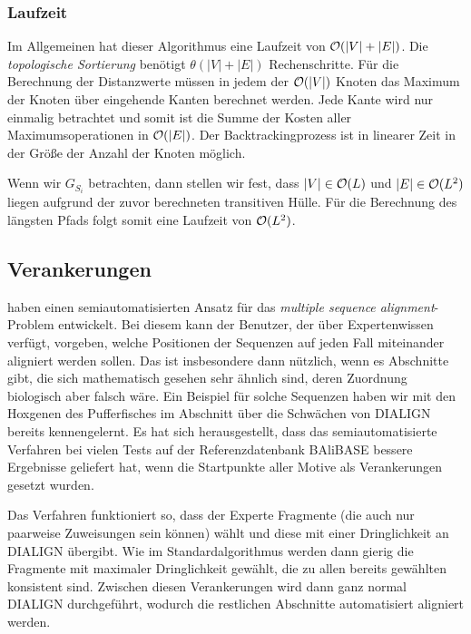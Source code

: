 \subsubsection{Laufzeit}

Im Allgemeinen hat dieser Algorithmus eine Laufzeit von $\mathcal{O}(|V| + |E|)$. Die \emph{topologische Sortierung} benötigt $\theta(|V| + |E|)$ Rechenschritte. Für die Berechnung der Distanzwerte müssen in jedem der $\mathcal{O}(|V|)$ Knoten das Maximum der Knoten über eingehende Kanten berechnet werden. Jede Kante wird nur einmalig betrachtet und somit ist die Summe der Kosten aller Maximumsoperationen in $\mathcal{O}(|E|)$. Der Backtrackingprozess ist in linearer Zeit in der Größe der Anzahl der Knoten möglich.

Wenn wir $G_{S_i}$ betrachten, dann stellen wir fest, dass $|V| \in \mathcal{O}(L)$ und $|E| \in \mathcal{O}(L^2)$ liegen aufgrund der zuvor berechneten transitiven Hülle. Für die Berechnung des längsten Pfads folgt somit eine Laufzeit von $\mathcal{O}(L^2)$.

\subsection{Verankerungen}

\cite{mpps06} haben einen semiautomatisierten Ansatz für das \emph{multiple sequence alignment}-Problem entwickelt. Bei diesem kann der Benutzer, der über Expertenwissen verfügt, vorgeben, welche Positionen der Sequenzen auf jeden Fall miteinander aligniert werden sollen. Das ist insbesondere dann nützlich, wenn es Abschnitte gibt, die sich mathematisch gesehen sehr ähnlich sind, deren Zuordnung biologisch aber falsch wäre. Ein Beispiel für solche Sequenzen haben wir mit den Hoxgenen des Pufferfisches im Abschnitt über die Schwächen von DIALIGN bereits kennengelernt. Es hat sich herausgestellt, dass das semiautomatisierte Verfahren bei vielen Tests auf der Referenzdatenbank BAliBASE bessere Ergebnisse geliefert hat, wenn die Startpunkte aller Motive als Verankerungen gesetzt wurden.

Das Verfahren funktioniert so, dass der Experte Fragmente (die auch nur paarweise Zuweisungen sein können) wählt und diese mit einer Dringlichkeit an DIALIGN übergibt. Wie im Standardalgorithmus werden dann gierig die Fragmente mit maximaler Dringlichkeit gewählt, die zu allen bereits gewählten konsistent sind. Zwischen diesen Verankerungen wird dann ganz normal DIALIGN durchgeführt, wodurch die restlichen Abschnitte automatisiert aligniert werden.

